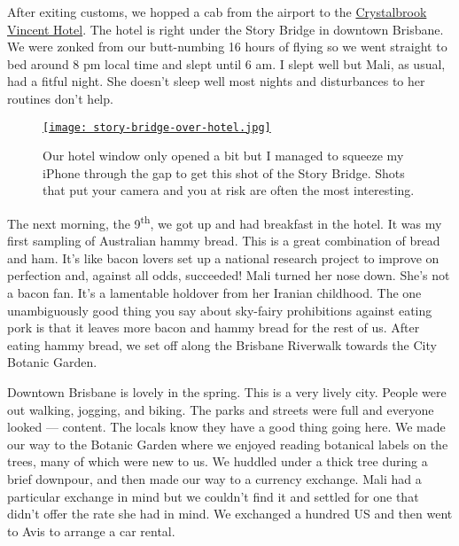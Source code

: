 After exiting customs, we hopped a cab from the airport to the
\href{https://www.crystalbrookcollection.com/vincent}{Crystalbrook
Vincent Hotel}. The hotel is right under the Story Bridge in downtown
Brisbane. We were zonked from our butt-numbing 16 hours of flying so we
went straight to bed around 8 pm local time and slept until 6 am. I
slept well but Mali, as usual, had a fitful night. She doesn't sleep
well most nights and disturbances to her routines don't help.

\captionsetup[figure]{labelformat=empty}
\begin{SCfigure}
\centering
\href{https://conceptcontrol.smugmug.com/Trips/Overseas/Australia-New-Zealand-2022/i-FwCCp3L/A}{\texttt{[image: story-bridge-over-hotel.jpg]}}
\caption[Story Bridge over our hotel]{Our hotel window only opened a bit but I managed to squeeze my
iPhone through the gap to get this shot of the Story Bridge. Shots that
put your camera and you at risk are often the most interesting.}
\label{fig:7548x0}
\end{SCfigure}
 

The next morning, the 9\textsuperscript{th}, we got up and had breakfast
in the hotel. It was my first sampling of Australian hammy bread. This
is a great combination of bread and ham. It's like bacon lovers set up a
national research project to improve on perfection and, against all
odds, succeeded! Mali turned her nose down. She's not a bacon fan. It's
a lamentable holdover from her Iranian childhood. The one unambiguously
good thing you say about sky-fairy prohibitions against eating pork is
that it leaves more bacon and hammy bread for the rest of us. After
eating hammy bread, we set off along the Brisbane Riverwalk towards the
City Botanic Garden.

Downtown Brisbane is lovely in the spring. This is a very lively city.
People were out walking, jogging, and biking. The parks and streets were
full and everyone looked --- content. The locals know they have a good
thing going here. We made our way to the Botanic Garden where we enjoyed
reading botanical labels on the trees, many of which were new to us. We
huddled under a thick tree during a brief downpour, and then made our
way to a currency exchange. Mali had a particular exchange in mind but
we couldn't find it and settled for one that didn't offer the rate she
had in mind. We exchanged a hundred US and then went to Avis to arrange
a car rental.

